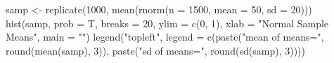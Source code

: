\begin{Schunk}
\begin{Sinput}
 samp <- replicate(1000, mean(rnorm(n = 1500, 
     mean = 50, sd = 20)))
 hist(samp, prob = T, breaks = 20, ylim = c(0, 
     1), xlab = "Normal Sample Means", main = "")
 legend("topleft", legend = c(paste("mean of means=", 
     round(mean(samp), 3)), paste("sd of means=", 
     round(sd(samp), 3))))
\end{Sinput}
\end{Schunk}
